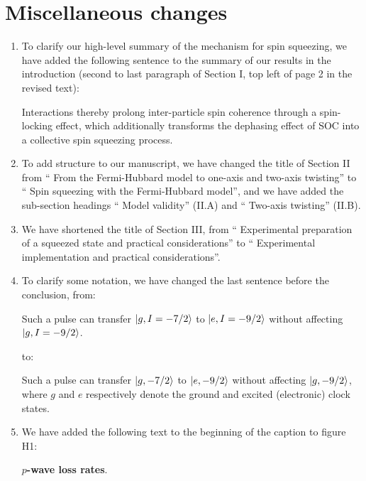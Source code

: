 \documentclass[preprint,superscriptaddress]{revtex4-2}
\renewcommand{\ket}{\Ket}
\newcommand{\red}[1]{{\color{red} #1}}
\newcommand{\green}[1]{{\color{ForestGreen} #1}}
\begin{document}
\section{Miscellaneous changes}

\begin{enumerate}
\item To clarify our high-level summary of the mechanism for spin
  squeezing, we have added the following sentence to the summary of
  our results in the introduction (second to last paragraph of Section
  I, top left of page 2 in the revised text):

  \green{Interactions thereby prolong inter-particle spin coherence
    through a spin-locking effect, which additionally transforms the
    dephasing effect of SOC into a collective spin squeezing process.}

\item To add structure to our manuscript, we have changed the title of
  Section II from ``\red{From the Fermi-Hubbard model to one-axis and
    two-axis twisting}'' to ``\green{Spin squeezing with the
    Fermi-Hubbard model}'', and we have added the sub-section headings
  ``\green{Model validity}'' (II.A) and ``\green{Two-axis twisting}''
  (II.B).

\item We have shortened the title of Section III, from
  ``\red{Experimental preparation of a squeezed state and practical
    considerations}'' to ``\green{Experimental implementation and
    practical considerations}''.

\item To clarify some notation, we have changed the last sentence
  before the conclusion, from:

  \red{Such a pulse can transfer $\ket{g, I=-7/2}$ to
    $\ket{e, I=-9/2}$ without affecting $\ket{g, I=-9/2}$.}

  to:

  \green{Such a pulse can transfer $\ket{g,-7/2}$ to $\ket{e,-9/2}$
    without affecting $\ket{g,-9/2}$, where $g$ and $e$ respectively
    denote the ground and excited (electronic) clock states.}

\item We have added the following text to the beginning of the caption
  to figure H1:

  \green{{\bf $p$-wave loss rates}.}
\end{enumerate}
\end{document}
